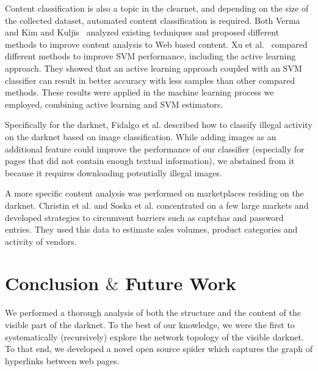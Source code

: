 \documentclass[USenglish,oneside,twocolumn]{article}
\begin{document}
Content classification is also a topic in the clearnet, and depending on the size of the collected dataset, automated content classification is required. 
Both Verma~\cite{Verma2013} and Kim and Kuljis~\cite{Kim2010} analyzed existing techniques and proposed different methods to improve content analysis to Web based content. Xu et al.~\cite{Xu2009} compared different methods to improve SVM performance, including the active learning approach. They showed that an active learning approach coupled with an SVM classifier can result in better accuracy with less samples than other compared methods. These results were applied in the machine learning process we employed, combining active learning and SVM estimators.

Specifically for the darknet, Fidalgo et al. \cite{Fidalgo2017} described how to classify illegal activity on the darknet based on image classification. While adding images as an additional feature could improve the performance of our classifier (especially for pages that did not contain enough textual information), we abstained from it because  it requires downloading potentially illegal images.


A more specific content analysis was performed on marketplaces residing on the darknet. Christin et al. \cite{Christin2013} and Soska et al. \cite{KyleSoska2015} concentrated on a few large markets and developed strategies to circumvent barriers such as captchas and password entries. They used this data to estimate sales volumes, product categories and activity of vendors.


\section{Conclusion $\&$ Future Work}

We performed a thorough analysis of both the structure and the content of the visible part of the darknet. To the best of our knowledge, we were the first to systematically (recursively) explore the network topology of the visible darknet. To that end, we developed a novel open source spider which captures the graph of hyperlinks between web pages. 
\end{document}
